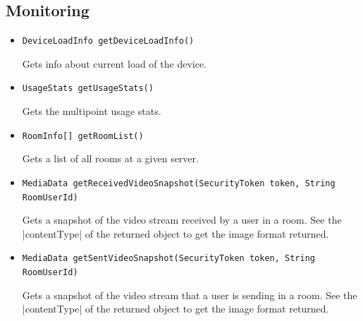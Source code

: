 \documentclass[a4paper]{report}
\newenvironment{Api}{\begin{itemize}}{\end{itemize}}
\newcommand{\ApiCode}[1]{\lstinline[style=styleApi]|#1|}
\newcommand{\ApiItem}[1]{\item #1 %

}
\newcommand{\ApiCmd}[1]{\ApiItem{\ApiCode{#1}}}
\begin{document}
\subsection{Monitoring}
\begin{Api}

\ApiCmd{DeviceLoadInfo getDeviceLoadInfo()}
Gets info about current load of the device.

\ApiCmd{UsageStats getUsageStats()}
Gets the multipoint usage stats.

\ApiCmd{RoomInfo[] getRoomList()}
Gets a list of all rooms at a given server.

\ApiCmd{MediaData getReceivedVideoSnapshot(SecurityToken token, String RoomUserId)}
Gets a snapshot of the video stream received by a user in a room. See the |contentType| of the returned object to get the image format returned.

\ApiCmd{MediaData getSentVideoSnapshot(SecurityToken token, String RoomUserId)}
Gets a snapshot of the video stream that a user is sending in a room. See the |contentType| of the returned object to get the image format returned.

\end{Api}
\end{document}
